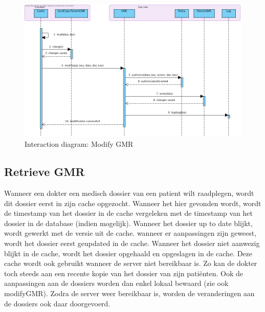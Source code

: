 \documentclass[a4paper,10pt]{article}
\begin{document}
\begin{figure}[!h]
  \includegraphics[width=\textwidth]{../images/modifyGMR.png}
  \caption{Interaction diagram: Modify GMR}
\end{figure}

\subsection{Retrieve GMR}
Wanneer een dokter een medisch dossier van een patient wilt raadplegen, wordt dit dossier eerst in zijn cache opgezocht. Wanneer het hier gevonden wordt, wordt de timestamp van het dossier in de cache vergeleken met de timestamp van het dossier in de database (indien mogelijk). Wanneer het dossier up to date blijkt, wordt gewerkt met de versie uit de cache. wanneer er aanpassingen zijn geweest, wordt het dossier eerst geupdated in de cache. Wanneer het dossier niet aanwezig blijkt in de cache, wordt het dossier opgehaald en opgeslagen in de cache. 
Deze cache wordt ook gebruikt wanneer de server niet bereikbaar is. Zo kan de dokter toch steeds aan een recente kopie van het dossier van zijn patiënten. Ook de aanpassingen aan de dossiers worden dan enkel lokaal bewaard (zie ook modifyGMR). Zodra de server weer bereikbaar is, worden de veranderingen aan de dossiers ook daar doorgevoerd. 
\end{document}
